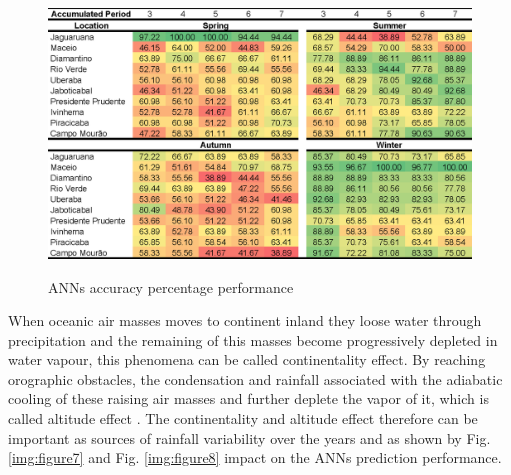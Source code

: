\begin{figure}[htb!]
 \centering
  \caption{ANNs accuracy percentage performance}
 \includegraphics[scale=0.60]{capitulo_3/general_table}
 \label{img:figure6}
\end{figure}

When oceanic air masses moves to continent inland they loose water through precipitation and the remaining of this masses become progressively depleted in water vapour, this phenomena can be called continentality effect. By reaching orographic obstacles, the condensation and rainfall associated with the adiabatic cooling of these raising air masses and further deplete the vapor of it, which is called altitude effect \cite{vuille2003modeling}. The continentality and altitude effect therefore can be important as sources of rainfall variability over the years and as shown by Fig.\ref{img:figure7} and Fig. \ref{img:figure8} impact on the ANNs prediction performance. 


